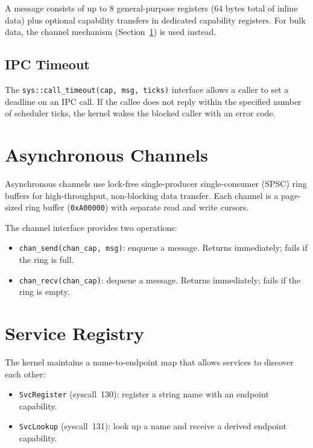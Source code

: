 \documentclass[11pt,a4paper,twoside]{report}
\theoremstyle{definition}
\newcommand{\syscall}[1]{\texttt{#1}}
\newcommand{\hex}[1]{\texttt{0x#1}}
\begin{document}
A message consists of up to 8 general-purpose registers (64 bytes total of
inline data) plus optional capability transfers in dedicated capability
registers. For bulk data, the channel mechanism (Section~\ref{sec:async})
is used instead.

\subsection{IPC Timeout}

The \syscall{sys::call\_timeout(cap, msg, ticks)} interface allows a caller
to set a deadline on an IPC call. If the callee does not reply within the
specified number of scheduler ticks, the kernel wakes the blocked caller
with an error code.

\section{Asynchronous Channels}
\label{sec:async}

Asynchronous channels use lock-free single-producer single-consumer (SPSC)
ring buffers for high-throughput, non-blocking data transfer. Each channel
is a page-sized ring buffer (\hex{A00000}) with separate read and write
cursors.

The channel interface provides two operations:
\begin{itemize}[leftmargin=1.4em]
  \item \syscall{chan\_send(chan\_cap, msg)}: enqueue a message. Returns
    immediately; fails if the ring is full.
  \item \syscall{chan\_recv(chan\_cap)}: dequeue a message. Returns
    immediately; fails if the ring is empty.
\end{itemize}

\section{Service Registry}

The kernel maintains a name-to-endpoint map that allows services to discover
each other:

\begin{itemize}[leftmargin=1.4em]
  \item \syscall{SvcRegister} (syscall~130): register a string name with
    an endpoint capability.
  \item \syscall{SvcLookup} (syscall~131): look up a name and receive a
    derived endpoint capability.
\end{itemize}
\end{document}
